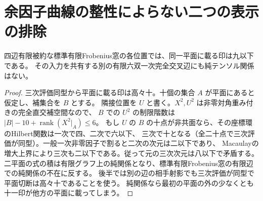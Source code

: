 \section{余因子曲線の整性によらない二つの表示の排除}
\label{sec:unrestricted-binary-formats}
\begin{lemma}\label{lem:finite-nine-on-plane}
四辺有限被約な標準有限Frobenius窓の各位置では、同一平面に載る印は九以下である。
その入力を共有する別の有限六双一次完全交叉辺にも純テンソル関係はない。
\end{lemma}
\begin{proof}
三次評価同型から平面に載る印は高々十。十個の集合 $A$ が平面にあると仮定し、補集合を $B$ とする。
隣接位置を $U$ と書く。$X^2,U^2$ は非零対角重み付きの完全直交補空間なので、
$B$ での $U^2$ の制限階数は $|B|-10+\operatorname{rank}(X^2|_A)\le6$。
もし $U$ の $B$ の十点が非共面なら、その座標環のHilbert関数は一次で四、二次で六以下、
三次で十となる（全二十点で三次評価が同型）。一般一次非零因子で割ると二次の次元は二以下であり、
Macaulayの増大上界により三次も二以下である。従って元の三次次元は八以下で矛盾する。
二平面の式の積は有限グラフ上の純関係となり、標準有限Frobenius窓の有限辺での純関係の不在に反する。
後半では別の辺の相手射影でも三次評価が同型で平面切断は高々十であることを使う。
純関係なら最初の平面の外の少なくとも十一印が他方の平面に載ってしまう。
\end{proof}

